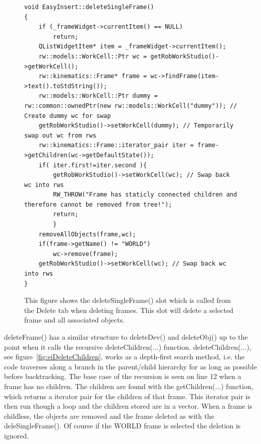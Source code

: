 \begin{figure}[h] %
\centering
\lstset{language=C++} 
\begin{lstlisting}[frame=single]  
void EasyInsert::deleteSingleFrame()
{
    if (_frameWidget->currentItem() == NULL) 
    	return;
    QListWidgetItem* item = _frameWidget->currentItem();
    rw::models::WorkCell::Ptr wc = getRobWorkStudio()->getWorkCell();
    rw::kinematics::Frame* frame = wc->findFrame(item->text().toStdString());
    rw::models::WorkCell::Ptr dummy = rw::common::ownedPtr(new rw::models::WorkCell("dummy")); // Create dummy wc for swap
    getRobWorkStudio()->setWorkCell(dummy); // Temporarily swap out wc from rws
    rw::kinematics::Frame::iterator_pair iter = frame->getChildren(wc->getDefaultState());
    if( iter.first!=iter.second ){
        getRobWorkStudio()->setWorkCell(wc); // Swap back wc into rws
        RW_THROW("Frame has staticly connected children and therefore cannot be removed from tree!");
        return;
        }
    removeAllObjects(frame,wc);
    if(frame->getName() != "WORLD")
        wc->remove(frame);
    getRobWorkStudio()->setWorkCell(wc); // Swap back wc into rws
}
\end{lstlisting}
\caption{This figure shows the deleteSingleFrame() slot which is called from the Delete tab when deleting frames. This slot will delete a selected frame and all associated objects.}
\label{fig:eiDeleteSingleFrame} 	
\end{figure}

deleteFrame() has a similar structure to deleteDev() and deleteObj() up to the point when it calls the recursive deleteChildren(...) function. deleteChildren(...), see figure~\ref{fig:eiDeleteChildren}, works as a depth-first search method, i.e. the code traverses along a branch in the parent/child hierarchy for as long as possible before backtracking. The base case of the recursion is seen on line 12 when a frame has no children. The children are found with the getChildren(...) function, which returns a iterator pair for the children of that frame. This iterator pair is then run though a loop and the children stored are in a vector. When a frame is childless, the objects are removed and the frame deleted as with the deleSingleFrame(). Of course if the WORLD frame is selected the deletion is ignored.


